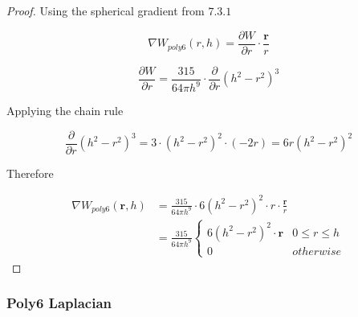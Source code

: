 \documentclass[12pt]{article}
\begin{document}
    \begin{proof}
        Using the spherical gradient from $7.3.1$

        $$\nabla W_{poly6}(r, h) = \frac{\partial{W}}{\partial{r}} \cdot \frac{\textbf{r}}{r}$$

        $$\frac{\partial{W}}{\partial{r}} = \frac{315}{64\pi{h}^9} \cdot \frac{\partial}{\partial{r}} (h^2 - r^2)^3$$

        Applying the chain rule

        $$\frac{\partial}{\partial{r}} (h^2 - r^2)^3 = 3 \cdot (h^2 - r^2)^2 \cdot (-2r) = 6r(h^2 - r^2)^2$$

        Therefore

        \begin{align*}
            \nabla W_{poly6}(\mathbf{r}, h) 
            &= \frac{315}{64\pi h^9} \cdot 6(h^2 - r^2)^2 \cdot r \cdot \frac{\mathbf{r}}{r} \\
            &= \frac{315}{64\pi h^9}
            \begin{cases}
                6(h^2 - r^2)^2 \cdot \textbf{r} & 0 \leq r \leq h \\
                0 & otherwise
            \end{cases}
        \end{align*}
    \end{proof}

    \subsubsection{Poly6 Laplacian}
\end{document}
